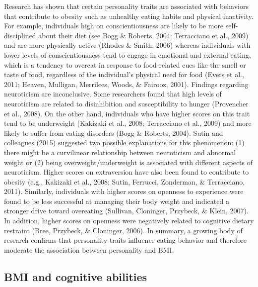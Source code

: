\documentclass[man]{apa6}
\begin{document}
Research has shown that certain personality traits are associated with behaviors that contribute to obesity such as unhealthy eating habits and physical inactivity. For example, individuals high on conscientiousness are likely to be more self-disciplined about their diet (see Bogg \& Roberts, 2004; Terracciano et al., 2009) and are more physically active (Rhodes \& Smith, 2006) whereas individuals with lower levels of conscientiousness tend to engage in emotional and external eating, which is a tendency to overeat in response to food-related cues like the smell or taste of food, regardless of the individual's physical need for food (Evers et al., 2011; Heaven, Mulligan, Merrilees, Woods, \& Fairooz, 2001). Findings regarding neuroticism are inconclusive. Some researchers found that high levels of neuroticism are related to disinhibition and susceptibility to hunger (Provencher et al., 2008). On the other hand, individuals who have higher scores on this trait tend to be underweight (Kakizaki et al., 2008; Terracciano et al., 2009) and more likely to suffer from eating disorders (Bogg \& Roberts, 2004). Sutin and colleagues (2015) suggested two possible explanations for this phenomenon: (1) there might be a curvilinear relationship between neuroticism and abnormal weight or (2) being overweight/underweight is associated with different aspects of neuroticism. Higher scores on extraversion have also been found to contribute to obesity (e.g., Kakizaki et al., 2008; Sutin, Ferrucci, Zonderman, \& Terracciano, 2011). Similarly, individuals with higher scores on openness to experience were found to be less successful at managing their body weight and indicated a stronger drive toward overeating (Sullivan, Cloninger, Przybeck, \& Klein, 2007). In addition, higher scores on openness were negatively related to cognitive dietary restraint (Bree, Przybeck, \& Cloninger, 2006). In summary, a growing body of research confirms that personality traits influence eating behavior and therefore moderate the association between personality and BMI.

\hypertarget{bmi-and-cognitive-abilities}{%
\subsection{BMI and cognitive abilities}\label{bmi-and-cognitive-abilities}}
\end{document}
